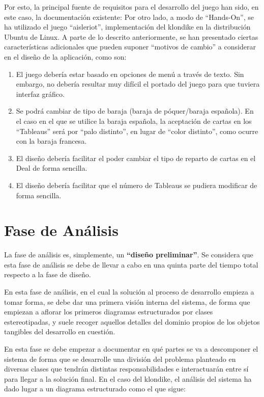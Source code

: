 \documentclass[11pt]{article}
\begin{document}
Por esto, la principal fuente de requisitos para el desarrollo del juego han sido, en este caso, la documentación existente:
Por otro lado, a modo de ``Hands-On'', se ha utilizado el juego ``aisleriot'', implementación del klondike en la distribución Ubuntu de Linux.
A parte de lo descrito anteriormente, se han presentado ciertas características adicionales que pueden suponer ``motivos de cambio'' a considerar en el diseño de la aplicación, como son:

\begin{enumerate}\itemsep0pt
\item{El juego debería estar basado en opciones de menú a través de texto}. Sin embargo, no debería resultar muy difícil el portado del juego para que tuviera interfaz gráfico.
\item{Se podrá cambiar de tipo de baraja (baraja de póquer/baraja española)}. En el caso en el que se utilice la baraja española, la aceptación de cartas en los ``Tableaus'' será por ``palo distinto'', en lugar de ``color distinto'', como ocurre con la baraja francesa.
\item{El diseño debería facilitar el poder cambiar el tipo de reparto de cartas en el Deal de forma sencilla}.
\item{El diseño debería facilitar que el número de Tableaus se pudiera modificar de forma sencilla}.
\end{enumerate}

\pagebreak

\section{Fase de Análisis}
La fase de análisis es, simplemente, un \textbf{``diseño preliminar''}. Se considera que esta fase de análisis se debe de llevar a cabo en una quinta parte del tiempo total respecto a la fase de diseño.

En esta fase de análisis, en el cual la solución al proceso de desarrollo empieza a tomar forma, se debe dar una primera visión interna del sistema, de forma que empiezan a aflorar los primeros diagramas estructurados por clases estereotipadas, y suele recoger aquellos detalles del dominio propios de los objetos tangibles del desarrollo en cuestión.

En esta fase se debe empezar a documentar en qué partes se va a descomponer el sistema de forma que se desarrolle una división del problema planteado en diversas clases que tendrán distintas responsabilidades e interactuarán entre sí para llegar a la solución final. En el caso del klondike, el análisis del sistema ha dado lugar a un diagrama estructurado como el que sigue: 
\end{document}
